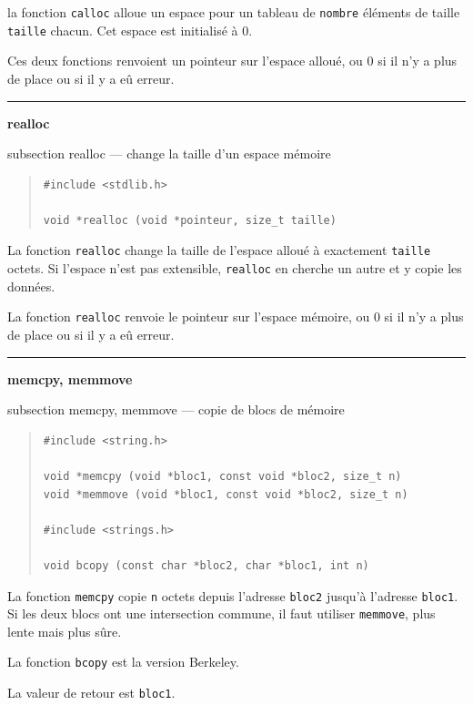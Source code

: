 \documentclass [twoside] {report}
\newcommand {\primitive} [1]
    {
	\phantomsection
	{\large \textbf {#1}}
	\addcontentsline {toc} {subsection} {#1}
    }
\newcommand {\separation}
    {
	\vspace {5mm}
	\nopagebreak
	\hrule
    }
\begin{document}
la fonction \texttt {calloc} alloue un espace pour un tableau de
\texttt {nombre} éléments de taille \texttt {taille} chacun. Cet espace
est initialisé à 0.

Ces deux fonctions renvoient un pointeur sur l'espace
alloué, ou 0 si il n'y a plus de place ou si il y a eû
erreur.


\separation
\primitive {realloc} --- change la taille d'un espace mémoire

\begin {quote}
\begin {verbatim}
#include <stdlib.h>

void *realloc (void *pointeur, size_t taille)
\end{verbatim}
\end {quote}

La fonction \texttt {realloc} change la taille de l'espace alloué
à exactement \texttt {taille} octets. Si l'espace n'est pas
extensible, \texttt {realloc} en cherche un autre et y copie les
données.

La fonction \texttt {realloc} renvoie le pointeur sur l'espace
mémoire, ou 0 si il n'y a plus de place ou si il y a eû
erreur.





\separation
\primitive {memcpy, memmove} --- copie de blocs de mémoire

\begin {quote}
\begin {verbatim}
#include <string.h>

void *memcpy (void *bloc1, const void *bloc2, size_t n)
void *memmove (void *bloc1, const void *bloc2, size_t n)

#include <strings.h>

void bcopy (const char *bloc2, char *bloc1, int n)
\end{verbatim}
\end {quote}

La fonction \texttt {memcpy} copie \texttt {n} octets depuis l'adresse
\texttt {bloc2} jusqu'à l'adresse \texttt {bloc1}. Si les deux blocs ont une
intersection commune, il faut utiliser \texttt {memmove}, plus lente mais
plus sûre.

La fonction \texttt {bcopy} est la version Berkeley.

La valeur de retour est \texttt {bloc1}.
\end{document}
